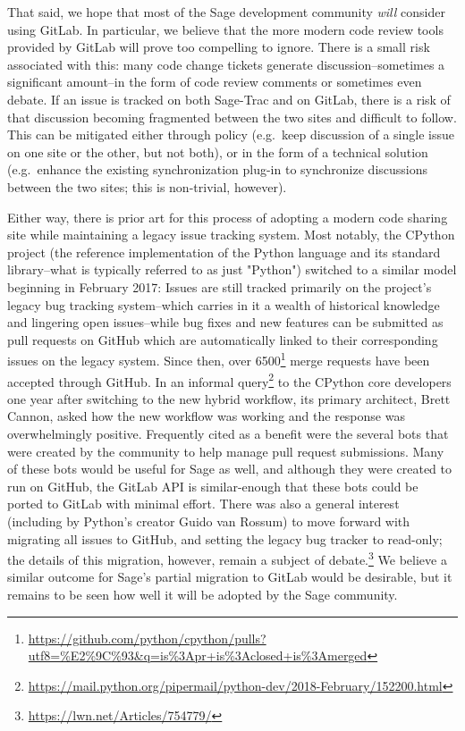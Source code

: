 {That said, we hope that most of the Sage development community {\em will}
consider using GitLab.  In particular, we believe that the more modern code
review tools provided by GitLab will prove too compelling to ignore.  There
is a small risk associated with this: many code change tickets generate
discussion--sometimes a significant amount--in the form of code review comments
or sometimes even debate.  If an issue is tracked on both Sage-Trac and on
GitLab, there is a risk of that discussion becoming fragmented between the two
sites and difficult to follow.  This can be mitigated either through policy
(e.g.~keep discussion of a single issue on one site or the other, but not
both), or in the form of a technical solution (e.g.~enhance the existing
synchronization plug-in to synchronize discussions between the two sites; this
is non-trivial, however).


Either way, there is prior art for this process of adopting a modern code
sharing site while maintaining a legacy issue tracking system.  Most notably,
the CPython project (the reference implementation of the Python language and
its standard library--what is typically referred to as just "Python") switched
to a similar model beginning in February 2017: Issues are still tracked
primarily on the project's legacy bug tracking system--which carries in it a
wealth of historical knowledge and lingering open issues--while bug fixes and
new features can be submitted as pull requests on GitHub which are
automatically linked to their corresponding issues on the legacy system.  Since
then, over
6500\footnote{\url{https://github.com/python/cpython/pulls?utf8=\%E2\%9C\%93\&q=is\%3Apr+is\%3Aclosed+is\%3Amerged}}
merge requests have been accepted through GitHub.  In an informal
query\footnote{\url{https://mail.python.org/pipermail/python-dev/2018-February/152200.html}}
to the CPython core developers one year after switching to the new hybrid
workflow, its primary architect, Brett Cannon, asked how the new workflow was
working and the response was overwhelmingly positive.  Frequently cited as a
benefit were the several bots that were created by the community to help manage
pull request submissions.  Many of these bots would be useful for Sage as well,
and although they were created to run on GitHub, the GitLab API is
similar-enough that these bots could be ported to GitLab with minimal effort.
There was also a general interest (including by Python's creator Guido van
Rossum) to move forward with migrating all issues to GitHub, and setting the
legacy bug tracker to read-only; the details of this migration, however, remain
a subject of debate.\footnote{\url{https://lwn.net/Articles/754779/}}  We
believe a similar outcome for Sage's partial migration to GitLab would be
desirable, but it remains to be seen how well it will be adopted by the Sage
community.


}
